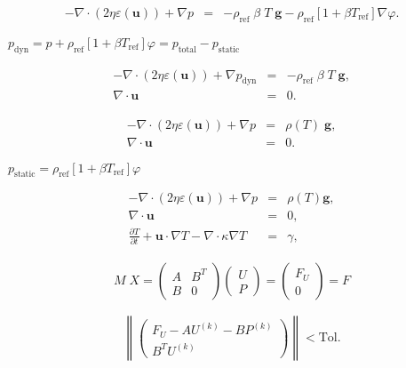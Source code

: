 \documentclass{article}
\begin{document}
\begin{eqnarray*} -\nabla \cdot (2 \eta \varepsilon ({\mathbf u})) + \nabla p &=& -\rho_{\text{ref}} \; \beta\; T\; \mathbf{g} -\rho_{\text{ref}} [1+\beta T_{\text{ref}}] \nabla\varphi. \end{eqnarray*}
\pagebreak

$p_{\text{dyn}}=p+\rho_{\text{ref}} [1+\beta T_{\text{ref}}] \varphi=p_{\text{total}}-p_{\text{static}}$
\pagebreak

\begin{eqnarray*} -\nabla \cdot (2 \eta \varepsilon ({\mathbf u})) + \nabla p_{\text{dyn}} &=& -\rho_{\text{ref}} \; \beta \; T \; \mathbf{g}, \\ \nabla \cdot {\mathbf u} &=& 0. \end{eqnarray*}
\pagebreak

\begin{eqnarray*} -\nabla \cdot (2 \eta \varepsilon ({\mathbf u})) + \nabla p &=& \rho(T)\; \mathbf{g}, \\ \nabla \cdot {\mathbf u} &=& 0. \end{eqnarray*}
\pagebreak

$p_\text{static}=\rho_{\text{ref}} [1+\beta T_{\text{ref}}] \varphi$
\pagebreak

\begin{eqnarray*} -\nabla \cdot (2 \eta \varepsilon ({\mathbf u})) + \nabla p &=& \rho(T) \mathbf{g}, \\ \nabla \cdot {\mathbf u} &=& 0, \\ \frac{\partial T}{\partial t} + {\mathbf u} \cdot \nabla T - \nabla \cdot \kappa \nabla T &=& \gamma, \end{eqnarray*}
\pagebreak

\begin{eqnarray*} M \; X = \left(\begin{array}{cc} A & B^T \\ B & 0 \end{array}\right) \left(\begin{array}{c} U \\ P \end{array}\right) = \left(\begin{array}{c} F_U \\ 0 \end{array}\right) = F \end{eqnarray*}
\pagebreak

\[ \left\| \left(\begin{array}{c} F_U - A U^{(k)} - B P^{(k)} \\ B^T U^{(k)} \end{array}\right) \right\| < \text{Tol}. \]
\pagebreak
\end{document}
